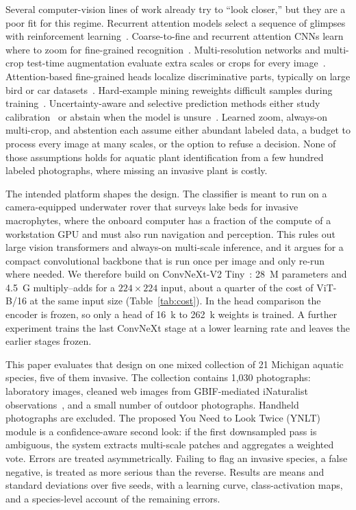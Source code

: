 \documentclass[final,3p,times,twocolumn]{elsarticle}
\begin{document}
Several computer-vision lines of work already try to ``look closer,'' but they are a poor fit for this regime. Recurrent attention models select a sequence of glimpses with reinforcement learning~\cite{mnih2014recurrent}. Coarse-to-fine and recurrent attention CNNs learn where to zoom for fine-grained recognition~\cite{fu2017look}. Multi-resolution networks and multi-crop test-time augmentation evaluate extra scales or crops for every image~\cite{krizhevsky2012imagenet, huang2018multiscale}. Attention-based fine-grained heads localize discriminative parts, typically on large bird or car datasets~\cite{fu2017look}. Hard-example mining reweights difficult samples during training~\cite{shrivastava2016training}. Uncertainty-aware and selective prediction methods either study calibration~\cite{Guoetal2017, Ovadiaetal2019, hendrycks2017baseline} or abstain when the model is unsure~\cite{geifman2017selective}. Learned zoom, always-on multi-crop, and abstention each assume either abundant labeled data, a budget to process every image at many scales, or the option to refuse a decision. None of those assumptions holds for aquatic plant identification from a few hundred labeled photographs, where missing an invasive plant is costly.

The intended platform shapes the design. The classifier is meant to run on a camera-equipped underwater rover that surveys lake beds for invasive macrophytes, where the onboard computer has a fraction of the compute of a workstation GPU and must also run navigation and perception. This rules out large vision transformers and always-on multi-scale inference, and it argues for a compact convolutional backbone that is run once per image and only re-run where needed. We therefore build on ConvNeXt-V2 Tiny~\cite{liu2022convnet, Wooetal2023}: 28~M parameters and 4.5~G multiply--adds for a $224\times 224$ input, about a quarter of the cost of ViT-B/16 at the same input size (Table~\ref{tab:cost}). In the head comparison the encoder is frozen, so only a head of 16~k to 262~k weights is trained. A further experiment trains the last ConvNeXt stage at a lower learning rate and leaves the earlier stages frozen.

This paper evaluates that design on one mixed collection of 21 Michigan aquatic species, five of them invasive. The collection contains 1{,}030 photographs: laboratory images, cleaned web images from GBIF-mediated iNaturalist observations~\cite{gbif2026, inaturalist2026}, and a small number of outdoor photographs. Handheld photographs are excluded. The proposed You Need to Look Twice (YNLT) module is a confidence-aware second look: if the first downsampled pass is ambiguous, the system extracts multi-scale patches and aggregates a weighted vote. Errors are treated asymmetrically. Failing to flag an invasive species, a false negative, is treated as more serious than the reverse. Results are means and standard deviations over five seeds, with a learning curve, class-activation maps, and a species-level account of the remaining errors.
\end{document}
